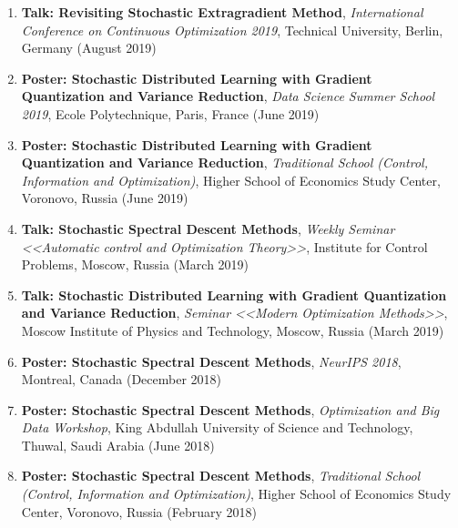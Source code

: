 \begin{enumerate}
\item {\bf Talk: Revisiting Stochastic Extragradient Method}, {\em International Conference on Continuous Optimization 2019}, Technical University, Berlin, Germany (August 2019)
\item {\bf Poster: Stochastic Distributed Learning with Gradient Quantization and Variance Reduction}, {\em Data Science Summer School 2019}, Ecole Polytechnique, Paris, France (June 2019)
\item {\bf Poster: Stochastic Distributed Learning with Gradient Quantization and Variance Reduction}, {\em Traditional School (Control, Information and Optimization)}, Higher School of Economics Study Center, Voronovo, Russia (June 2019)
\item {\bf Talk: Stochastic Spectral Descent Methods}, {\em Weekly Seminar <<Automatic control and Optimization Theory>>}, Institute for Control Problems, Moscow, Russia (March 2019)
\item {\bf Talk: Stochastic Distributed Learning with Gradient Quantization and Variance Reduction}, {\em Seminar <<Modern Optimization Methods>>}, Moscow Institute of Physics and Technology, Moscow, Russia (March 2019)
\item {\bf Poster: Stochastic Spectral Descent Methods}, {\em NeurIPS 2018}, Montreal, Canada (December 2018)
\item {\bf Poster: Stochastic Spectral Descent Methods}, {\em Optimization and Big Data Workshop}, King Abdullah University of Science and Technology, Thuwal, Saudi Arabia (June 2018)
\item {\bf Poster: Stochastic Spectral Descent Methods}, {\em Traditional School (Control, Information and Optimization)}, Higher School of Economics Study Center, Voronovo, Russia (February 2018)
\end{enumerate}

